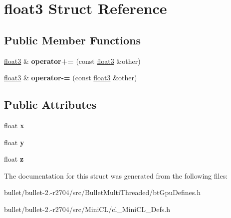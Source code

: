 \hypertarget{structfloat3}{\section{float3 Struct Reference}
\label{structfloat3}
}
\subsection*{Public Member Functions}
\begin{DoxyCompactItemize}
\item 
\hypertarget{structfloat3_a8dc80b5be79f44078b5c409ca224d9e4}{\hyperlink{structfloat3}{float3} \& {\bfseries operator+=} (const \hyperlink{structfloat3}{float3} \&other)}\label{structfloat3_a8dc80b5be79f44078b5c409ca224d9e4}

\item 
\hypertarget{structfloat3_aa0028ed20b1e7e64307ddaf999ada1a8}{\hyperlink{structfloat3}{float3} \& {\bfseries operator-\/=} (const \hyperlink{structfloat3}{float3} \&other)}\label{structfloat3_aa0028ed20b1e7e64307ddaf999ada1a8}

\end{DoxyCompactItemize}
\subsection*{Public Attributes}
\begin{DoxyCompactItemize}
\item 
\hypertarget{structfloat3_af621f02abb1c788738fe61ea9807ff9c}{float {\bfseries x}}\label{structfloat3_af621f02abb1c788738fe61ea9807ff9c}

\item 
\hypertarget{structfloat3_aa6147d421a81889971f8c66aa92abf0d}{float {\bfseries y}}\label{structfloat3_aa6147d421a81889971f8c66aa92abf0d}

\item 
\hypertarget{structfloat3_a772dffd42d89f350c5a1b766c4703245}{float {\bfseries z}}\label{structfloat3_a772dffd42d89f350c5a1b766c4703245}

\end{DoxyCompactItemize}


The documentation for this struct was generated from the following files\+:\begin{DoxyCompactItemize}
\item 
bullet/bullet-\/2.-\/r2704/src/\+Bullet\+Multi\+Threaded/bt\+Gpu\+Defines.\+h\item 
bullet/bullet-\/2.-\/r2704/src/\+Mini\+C\+L/cl\+\_\+\+Mini\+C\+L\+\_\+\+Defs.\+h\end{DoxyCompactItemize}
